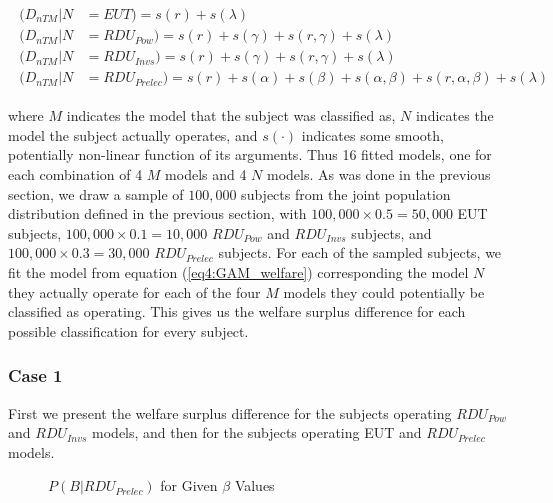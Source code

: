 \documentclass[../main.tex]{subfiles}
\begin{document}
\begin{align}
	\label{eq4:GAM_welfare}
	\begin{split}
		(D_{nTM} | N &= EUT)                   = s(r) + s(\lambda)\\
		(D_{nTM} | N &= \mathit{RDU_{Pow}})    = s(r) + s(\gamma) + s(r, \gamma) + s(\lambda)\\
		(D_{nTM} | N &= \mathit{RDU_{Invs}})   = s(r) + s(\gamma) + s(r, \gamma) + s(\lambda)\\
		(D_{nTM} | N &= \mathit{RDU_{Prelec}}) = s(r) + s(\alpha) + s(\beta) +s(\alpha, \beta) + s(r, \alpha, \beta) + s(\lambda)
	\end{split}
\end{align}

\noindent where $M$ indicates the model that the subject was classified as, $N$ indicates the model the subject actually operates, and $s(\cdot)$ indicates some smooth, potentially non-linear function of its arguments.
Thus 16 fitted models, one for each combination of 4 $M$ models and 4 $N$ models.
As was done in the previous section, we draw a sample of $100,000$ subjects from the joint population distribution defined in the previous section, with $100,000 \times 0.5 = 50,000$ EUT subjects, $100,000 \times 0.1 = 10,000$ $\mathit{RDU_{Pow}}$ and $\mathit{RDU_{Invs}}$ subjects, and $100,000 \times 0.3 = 30,000$ $\mathit{RDU_{Prelec}}$ subjects.
For each of the sampled subjects, we fit the model from equation (\ref{eq4:GAM_welfare}) corresponding the model $N$ they actually operate for each of the four $M$ models they could potentially be classified as operating.
This gives us the welfare surplus difference for each possible classification for every subject.

\subsubsection{Case 1}

First we present the welfare surplus difference for the subjects operating $\mathit{RDU_{Pow}}$ and $\mathit{RDU_{Invs}}$ models, and then for the subjects operating EUT and $\mathit{RDU_{Prelec}}$ models.

\begin{figure}[hp!]
	\center
	\caption{$P(B|RDU_{Prelec})$ for Given $\beta$ Values}
	\label{fig:HNG1_EUT_PRE_welfare}
\end{figure}
\end{document}
